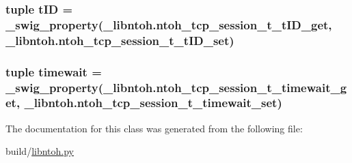 \hypertarget{classlibntoh_1_1ntoh__tcp__session__t_aa8af5c32a2a96a7fe7e14b7ebd2057ba}{
\subsubsection[{t\-I\-D}]{\setlength{\rightskip}{0pt plus 5cm}tuple t\-I\-D = {\bf \-\_\-swig\-\_\-property}(\-\_\-libntoh.\-ntoh\-\_\-tcp\-\_\-session\-\_\-t\-\_\-t\-I\-D\-\_\-get, \-\_\-libntoh.\-ntoh\-\_\-tcp\-\_\-session\-\_\-t\-\_\-t\-I\-D\-\_\-set)\hspace{0.3cm}{\ttfamily [static]}}}\label{classlibntoh_1_1ntoh__tcp__session__t_aa8af5c32a2a96a7fe7e14b7ebd2057ba}
\hypertarget{classlibntoh_1_1ntoh__tcp__session__t_a5dfb36debadedad1db9bdc1ad97ab821}{
\subsubsection[{timewait}]{\setlength{\rightskip}{0pt plus 5cm}tuple timewait = {\bf \-\_\-swig\-\_\-property}(\-\_\-libntoh.\-ntoh\-\_\-tcp\-\_\-session\-\_\-t\-\_\-timewait\-\_\-get, \-\_\-libntoh.\-ntoh\-\_\-tcp\-\_\-session\-\_\-t\-\_\-timewait\-\_\-set)\hspace{0.3cm}{\ttfamily [static]}}}\label{classlibntoh_1_1ntoh__tcp__session__t_a5dfb36debadedad1db9bdc1ad97ab821}


The documentation for this class was generated from the following file\-:\begin{DoxyCompactItemize}
\item 
build/\hyperlink{libntoh_8py}{libntoh.\-py}\end{DoxyCompactItemize}
